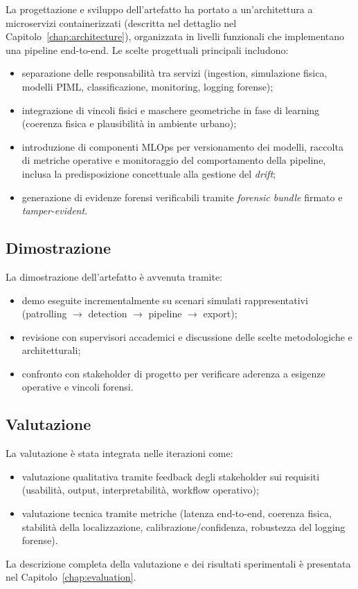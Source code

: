 La progettazione e sviluppo dell'artefatto ha portato a un'architettura a microservizi containerizzati (descritta nel dettaglio nel Capitolo~\ref{chap:architecture}), organizzata in livelli funzionali che implementano una pipeline end-to-end.
Le scelte progettuali principali includono:
\begin{itemize}
    \item separazione delle responsabilità tra servizi (ingestion, simulazione fisica, modelli PIML, classificazione, monitoring, logging forense);
    \item integrazione di vincoli fisici e maschere geometriche in fase di learning (coerenza fisica e plausibilità in ambiente urbano);
    \item introduzione di componenti MLOps per versionamento dei modelli, raccolta di metriche operative e monitoraggio del comportamento della pipeline, inclusa la predisposizione concettuale alla gestione del \textit{drift};
    \item generazione di evidenze forensi verificabili tramite \emph{forensic bundle} firmato e \emph{tamper-evident}.
\end{itemize}

\subsection{Dimostrazione}
\label{subsec:demonstration}

La dimostrazione dell'artefatto è avvenuta tramite:
\begin{itemize}
    \item demo eseguite incrementalmente su scenari simulati rappresentativi (patrolling $\rightarrow$ detection $\rightarrow$ pipeline $\rightarrow$ export);
    \item revisione con supervisori accademici e discussione delle scelte metodologiche e architetturali;
    \item confronto con stakeholder di progetto per verificare aderenza a esigenze operative e vincoli forensi.
\end{itemize}

\subsection{Valutazione}
\label{subsec:evaluation}

La valutazione è stata integrata nelle iterazioni come:
\begin{itemize}
    \item valutazione qualitativa tramite feedback degli stakeholder sui requisiti (usabilità, output, interpretabilità, workflow operativo);
    \item valutazione tecnica tramite metriche (latenza end-to-end, coerenza fisica, stabilità della localizzazione, calibrazione/confidenza, robustezza del logging forense).
\end{itemize}
La descrizione completa della valutazione e dei risultati sperimentali è presentata nel Capitolo~\ref{chap:evaluation}.

